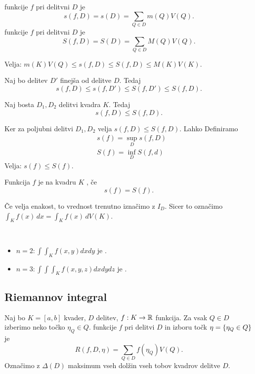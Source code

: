 \begin{definicija}
     funkcije \(f\) pri delitvni \(D\) je 
    \[s(f, D) = s(D) = \sum_{Q \in D} m(Q) V(Q).\]
     funkcije \(f\) pri delitvni \(D\) je 
    \[S(f, D) = S(D) = \sum_{Q \in D} M(Q) V(Q).\]
\end{definicija}
\begin{opomba}
    Velja: \(m(K)V(Q) \leq s(f, D) \leq S(f,D) \leq M(K)V(K)\).
\end{opomba}
\begin{lema}
    Naj bo delitev \(D'\) finejša od delitve \(D\). Tedaj
    \[s(f, D) \leq s(f, D') \leq S(f, D') \leq S(f, D).\]
\end{lema}
\begin{posledica}
    Naj bosta \(D_1, D_2\) delitvi kvadra \(K\). Tedaj
    \[s(f,D) \leq S(f, D).\]
\end{posledica}

Ker za poljubni delitvi \(D_1, D_2\) velja \(s(f,D) \leq S(f, D)\). Lahko Definiramo
\begin{align*}
    &s(f) = \sup_D s(f, D) \\
    &S(f) = \inf_D S(f, d)
\end{align*}
Velja: \(s(f) \leq S(f)\).
\begin{definicija}
    Funkcija \(f\) je na kvadru \(K\) , če 
    \[s(f) = S(f).\]
\end{definicija}

\begin{opomba}
    Če velja enakost, to vrednost trenutno iznačimo z \(I_D\). Sicer to označimo \(\int_K f(x) \, dx = \int_K f(x) \, dV(K)\).
\end{opomba}

\begin{primer}
    \
    \begin{itemize}
        \item[] \(n=2: \int \int_K f(x,y) dxdy\) je .
        \item[] \(n=3: \int \int \int_K f(x,y,z) dxdydz\) je .
    \end{itemize}
\end{primer}

\newpage
\subsection{Riemannov integral}
\begin{definicija}
    Naj bo \(K = [a,b]\) kvader, \(D\) delitev, \(f: K \to \mathbb{R}\) funkcija. Za vsak \(Q \in D\) izberimo neko točko \(\eta_Q \in Q\).  funkcije \(f\) pri delitvi \(D\) in izboru točk \(\eta = \left\{\eta_Q \in Q\right\}\) je 
    \[R(f, D, \eta) = \sum_{Q \in D} f(\eta_Q) V(Q).\]
    Označimo z \(\Delta(D)\) maksimum vseh dolžin vseh tobov kvadrov delitve \(D\).
\end{definicija}

